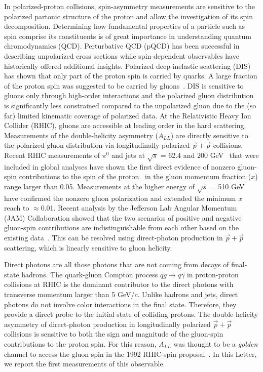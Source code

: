 \documentclass[twocolumn,letterpaper,aps,prl,longbibliography,superscriptaddress,floatfix]{revtex4-2}
\newcommand{\pizero}{\mbox{$\pi^0$}\xspace}
\newcommand{\ALL}{\mbox{$A_{LL}$}\xspace}
\begin{document}
In polarized-proton collisions, spin-asymmetry measurements are 
sensitive to the polarized partonic structure of the proton and allow 
the investigation of its spin decomposition. Determining how fundamental 
properties of a particle such as spin comprise its constituents 
is of great importance in understanding quantum chromodynamics (QCD). 
Perturbative QCD (pQCD) has been successful in describing unpolarized 
cross sections while spin-dependent observables have historically 
offered additional insights. Polarized deep-inelastic scattering (DIS) 
has shown that only part of the proton spin is carried by quarks.
A large fraction of the proton spin was suggested to be carried by 
gluons~\cite{1988364,ASHMAN19891,PhysRevD.58.112001,ALEXAKHIN20078, 
PhysRevD.75.012007}. DIS is sensitive to gluons only through high-order 
interactions and the polarized gluon distribution is significantly less 
constrained compared to the unpolarized gluon due to the (so far) limited 
kinematic coverage of polarized data. At the Relativistic Heavy 
Ion Collider (RHIC), gluons are accessible at leading order in the hard 
scattering.  Measurements of the double-helicity asymmetry (\ALL) are 
directly sensitive to the polarized gluon distribution via 
longitudinally polarized $\vec{p}+\vec{p}$ collisions. Recent RHIC 
measurements of \pizero and jets at $\sqrt{s}$ = 62.4 and 200 
GeV~\cite{PhysRevD.90.012007,PhysRevLett.103.012003,PhysRevD.79.012003, 
PhysRevD.86.032006,PhysRevLett.115.092002} that 
were included in global analyses have shown the first direct evidence of 
nonzero gluon-spin contributions to the spin of the 
proton~\cite{PhysRevLett.113.012001, 2014276} in the gluon momentum 
fraction ($x$) range larger than 0.05. Measurements at the higher energy 
of $\sqrt{s}$ = 510 GeV~\cite{PhysRevD.93.011501,PhysRevD.100.052005} 
have confirmed the nonzero gluon polarization and extended the minimum 
$x$ reach to $\approx$0.01. Recent analysis by the Jefferson Lab Angular 
Momentum (JAM) Collaboration showed that the two scenarios of positive 
and negative gluon-spin contributions are indistinguishable from each 
other based on the existing data~\cite{PhysRevD.105.074022,PhysRevD.106.L031502}.
This can be resolved using direct-photon production in 
$\vec{p}+\vec{p}$ scattering, which is linearly sensitive to gluon 
helicity.

Direct photons are all those photons that are not coming from decays of 
final-state hadrons. The quark-gluon Compton process $qg \rightarrow 
q\gamma$ in proton-proton collisions at RHIC is the dominant contributor 
to the direct photons with transverse momentum larger than 5 GeV/$c$. 
Unlike hadrons and jets, direct photons do not involve color 
interactions in the final state. Therefore, they provide a direct probe 
to the initial state of colliding protons. The double-helicity asymmetry 
of direct-photon production in longitudinally polarized $\vec{p}+\vec{p}$ 
collisions is sensitive to both the sign and magnitude of the gluon-spin 
contributions to the proton spin. For this reason, \ALL was thought 
to be a \textit{golden} channel to access the gluon spin in the 1992 
RHIC-spin proposal~\cite{Bunce:1992vca,doi:10.1146/annurev.nucl.50.1.525}. 
In this Letter, we report the first measurements of this observable.
\end{document}
